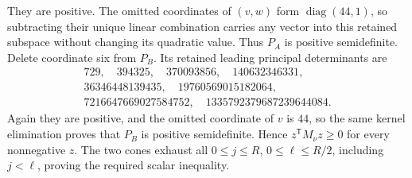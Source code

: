 They are positive. The omitted coordinates of $(v,w)$ form
$\operatorname{diag}(44,1)$, so subtracting their unique linear
combination carries any vector into this retained subspace without
changing its quadratic value. Thus $P_A$ is positive semidefinite.
Delete coordinate six from $P_B$. Its retained leading principal
determinants are
\[
\begin{gathered}
729,\quad394325,\quad370093856,\quad140632346331,\\
36346448139435,\quad19760569015182064,\\
7216647669027584752,\quad1335792379687239644084.
\end{gathered}
\]
Again they are positive, and the omitted coordinate of $v$ is $44$,
so the same kernel elimination proves that $P_B$ is positive
semidefinite. Hence $z^{\mathsf T}M_\nu z\geq0$ for every nonnegative
$z$. The two cones exhaust all $0\leq j\leq R$, $0\leq\ell\leq R/2$,
including $j<\ell$, proving the required scalar inequality.
